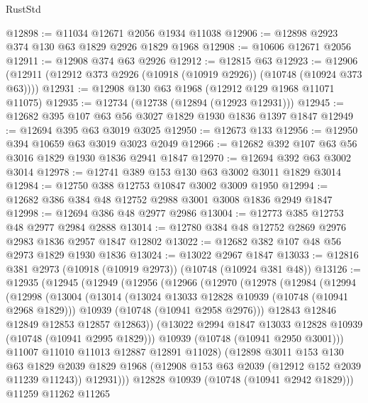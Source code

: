 \begin{lexlean}{RustStd}
\begin{coremodule}
@12898 := @11034 @12671 @2056 @1934 @11038
@12906 := @12898 @2923 @374 @130 @63 @1829 @2926 @1829 @1968
@12908 := @10606 @12671 @2056
@12911 := @12908 @374 @63 @2926
@12912 := @12815 @63
@12923 := @12906 (@12911 (@12912 @373 @2926 (@10918 (@10919 @2926)) (@10748 (@10924 @373 @63))))
@12931 := @12908 @130 @63 @1968 (@12912 @129 @1968 @11071 @11075)
@12935 := @12734 (@12738 (@12894 (@12923 @12931)))
@12945 := @12682 @395 @107 @63 @56 @3027 @1829 @1930 @1836 @1397 @1847
@12949 := @12694 @395 @63 @3019 @3025
@12950 := @12673 @133
@12956 := @12950 @394 @10659 @63 @3019 @3023 @2049
@12966 := @12682 @392 @107 @63 @56 @3016 @1829 @1930 @1836 @2941 @1847
@12970 := @12694 @392 @63 @3002 @3014
@12978 := @12741 @389 @153 @130 @63 @3002 @3011 @1829 @3014
@12984 := @12750 @388 @12753 @10847 @3002 @3009 @1950
@12994 := @12682 @386 @384 @48 @12752 @2988 @3001 @3008 @1836 @2949 @1847
@12998 := @12694 @386 @48 @2977 @2986
@13004 := @12773 @385 @12753 @48 @2977 @2984 @2888
@13014 := @12780 @384 @48 @12752 @2869 @2976 @2983 @1836 @2957 @1847 @12802
@13022 := @12682 @382 @107 @48 @56 @2973 @1829 @1930 @1836
@13024 := @13022 @2967 @1847
@13033 := @12816 @381 @2973 (@10918 (@10919 @2973)) (@10748 (@10924 @381 @48))
@13126 := @12935
    (@12945
      (@12949
        (@12956
          (@12966
            (@12970
              (@12978
                (@12984
                  (@12994
                    (@12998
                      (@13004
                        (@13014
                          (@13024 @13033 @12828 @10939 (@10748 (@10941 @2968 @1829)))
                          @10939
                          (@10748 (@10941 @2958 @2976)))
                        @12843
                        @12846
                        @12849
                        @12853
                        @12857
                        @12863))
                    (@13022 @2994 @1847 @13033 @12828 @10939 (@10748 (@10941 @2995 @1829)))
                    @10939
                    (@10748 (@10941 @2950 @3001)))
                  @11007
                  @11010
                  @11013
                  @12887
                  @12891
                  @11028)
                (@12898
                  @3011
                  @153
                  @130
                  @63
                  @1829
                  @2039
                  @1829
                  @1968
                  (@12908 @153 @63 @2039 (@12912 @152 @2039 @11239 @11243))
                  @12931)))
            @12828
            @10939
            (@10748 (@10941 @2942 @1829)))
          @11259
          @11262
          @11265

\end{coremodule}
\end{lexlean}
